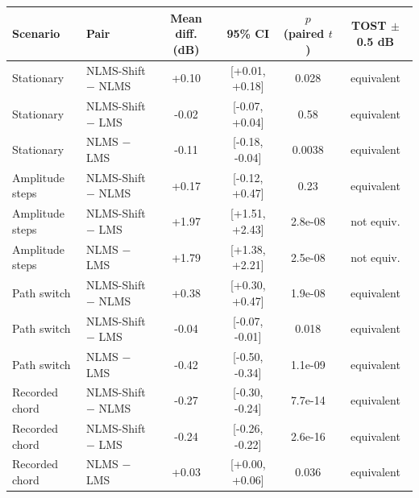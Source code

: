 \begin{tabular}{llcccc}\toprule
Scenario & Pair & Mean diff. (dB) & 95\% CI & $p$ (paired $t$) & TOST $\pm$0.5 dB\\\midrule
Stationary & NLMS-Shift $-$ NLMS & +0.10 & [+0.01, +0.18] & 0.028 & equivalent\\
Stationary & NLMS-Shift $-$ LMS & -0.02 & [-0.07, +0.04] & 0.58 & equivalent\\
Stationary & NLMS $-$ LMS & -0.11 & [-0.18, -0.04] & 0.0038 & equivalent\\
Amplitude steps & NLMS-Shift $-$ NLMS & +0.17 & [-0.12, +0.47] & 0.23 & equivalent\\
Amplitude steps & NLMS-Shift $-$ LMS & +1.97 & [+1.51, +2.43] & 2.8e-08 & not equiv.\\
Amplitude steps & NLMS $-$ LMS & +1.79 & [+1.38, +2.21] & 2.5e-08 & not equiv.\\
Path switch & NLMS-Shift $-$ NLMS & +0.38 & [+0.30, +0.47] & 1.9e-08 & equivalent\\
Path switch & NLMS-Shift $-$ LMS & -0.04 & [-0.07, -0.01] & 0.018 & equivalent\\
Path switch & NLMS $-$ LMS & -0.42 & [-0.50, -0.34] & 1.1e-09 & equivalent\\
Recorded chord & NLMS-Shift $-$ NLMS & -0.27 & [-0.30, -0.24] & 7.7e-14 & equivalent\\
Recorded chord & NLMS-Shift $-$ LMS & -0.24 & [-0.26, -0.22] & 2.6e-16 & equivalent\\
Recorded chord & NLMS $-$ LMS & +0.03 & [+0.00, +0.06] & 0.036 & equivalent\\
\bottomrule\end{tabular}
